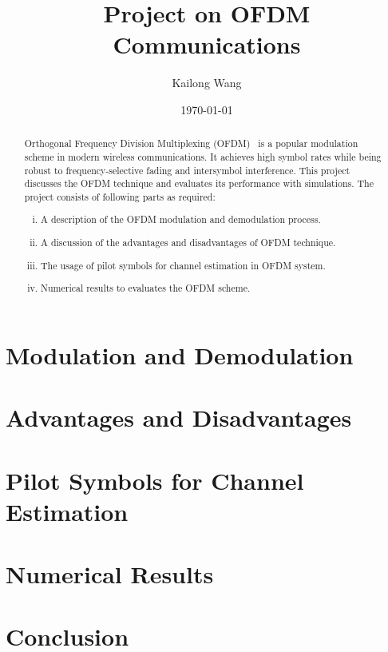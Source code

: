 \documentclass{article}
\title{Project on OFDM Communications}
\author{Kailong Wang}
\date{\today}
\begin{document}
\maketitle

\begin{abstract}
    Orthogonal Frequency Division Multiplexing (OFDM)~\cite{5307460} is a popular modulation scheme in modern wireless communications. It achieves high symbol rates while being robust to frequency-selective fading and intersymbol interference. This project discusses the OFDM technique and evaluates its performance with simulations. The project consists of following parts as required:
    \begin{enumerate}[(i)]
        \item A description of the OFDM modulation and demodulation process.
        \item A discussion of the advantages and disadvantages of OFDM technique.
        \item The usage of pilot symbols for channel estimation in OFDM system.
        \item Numerical results to evaluates the OFDM scheme.
    \end{enumerate}
\end{abstract}

\section{Modulation and Demodulation}
\label{sec:modulation}


\section{Advantages and Disadvantages}


\section{Pilot Symbols for Channel Estimation}


\section{Numerical Results}


\section{Conclusion}

\clearpage
\printbibliography
\end{document}
